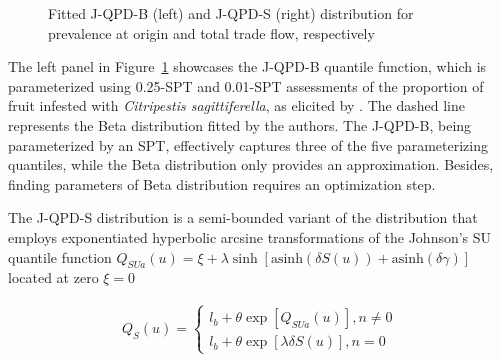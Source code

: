 \documentclass[
  fleqn,
  deca,
  blindrev
]{informs4}
\begin{document}
\begin{figure}


\caption{\label{fig-jqpd1}Fitted J-QPD-B (left) and J-QPD-S (right)
distribution for prevalence at origin and total trade flow,
respectively}

\end{figure}%

The left panel in Figure~\ref{fig-jqpd1} showcases the J-QPD-B quantile
function, which is parameterized using 0.25-SPT and 0.01-SPT assessments
of the proportion of fruit infested with \emph{Citripestis
sagittiferella}, as elicited by
\citet{efsa2023RiskAssessmentCitripestis}. The dashed line represents
the Beta distribution fitted by the authors. The J-QPD-B, being
parameterized by an SPT, effectively captures three of the five
parameterizing quantiles, while the Beta distribution only provides an
approximation. Besides, finding parameters of Beta distribution requires
an optimization step.

The J-QPD-S distribution is a semi-bounded variant of the distribution
that employs exponentiated hyperbolic arcsine transformations of the
Johnson's SU quantile function
\(Q_{SUa}(u) = \xi + \lambda\sinh\left[\text{asinh}(\delta S(u)) + \text{asinh}(\delta\gamma)\right]\)
located at zero \(\xi=0\)
\citep{hadlock2017JohnsonQuantileParameterizedDistributions}

\[
\begin{gathered}
Q_S(u)=\begin{cases}
l_b+\theta\exp\left[Q_{SUa}(u)\right],n \neq 0\\
l_b+\theta\exp\left[\lambda\delta S(u)\right],n=0
\end{cases}
\end{gathered}
\]
\end{document}
